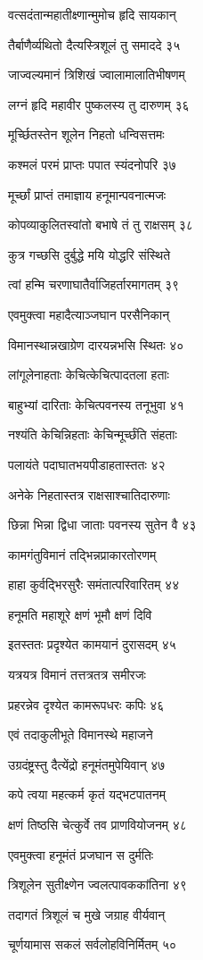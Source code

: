 वत्सदंतान्महातीक्ष्णान्मुमोच हृदि सायकान्

तैर्बाणैर्व्यथितो दैत्यस्त्रिशूलं तु समाददे ३५

जाज्वल्यमानं त्रिशिखं ज्वालामालातिभीषणम्

लग्नं हृदि महावीर पुष्कलस्य तु दारुणम् ३६

मूर्च्छितस्तेन शूलेन निहतो धन्विसत्तमः

कश्मलं परमं प्राप्तः पपात स्यंदनोपरि ३७

मूर्च्छां प्राप्तं तमाज्ञाय हनूमान्पवनात्मजः

कोपव्याकुलितस्वांतो बभाषे तं तु राक्षसम् ३८

कुत्र गच्छसि दुर्बुद्धे मयि योद्धरि संस्थिते

त्वां हन्मि चरणाघातैर्वाजिहर्तारमागतम् ३९

एवमुक्त्वा महादैत्याञ्जघान परसैनिकान्

विमानस्थान्नखाग्रेण दारयन्नभसि स्थितः ४०

लांगूलेनाहताः केचित्केचित्पादतला हताः

बाहुभ्यां दारिताः केचित्पवनस्य तनूभुवा ४१

नश्यंति केचिन्निहताः केचिन्मूर्च्छंति संहताः

पलायंते पदाघातभयपीडाहतास्ततः ४२

अनेके निहतास्तत्र राक्षसाश्चातिदारुणाः

छिन्ना भिन्ना द्विधा जाताः पवनस्य सुतेन वै ४३

कामगंतुविमानं तद्भिन्नप्राकारतोरणम्

हाहा कुर्वद्भिरसुरैः समंतात्परिवारितम् ४४

हनूमति महाशूरे क्षणं भूमौ क्षणं दिवि

इतस्ततः प्रदृश्येत कामयानं दुरासदम् ४५

यत्रयत्र विमानं तत्तत्रतत्र समीरजः

प्रहरन्नेव दृश्येत कामरूपधरः कपिः ४६

एवं तदाकुलीभूते विमानस्थे महाजने

उग्रदंष्ट्रस्तु दैत्येंद्रो हनूमंतमुपेयिवान् ४७

कपे त्वया महत्कर्म कृतं यद्भटपातनम्

क्षणं तिष्ठसि चेत्कुर्वे तव प्राणवियोजनम् ४८

एवमुक्त्वा हनूमंतं प्रजघान स दुर्मतिः

त्रिशूलेन सुतीक्ष्णेन ज्वलत्पावककांतिना ४९

तदागतं त्रिशूलं च मुखे जग्राह वीर्यवान्

चूर्णयामास सकलं सर्वलोहविनिर्मितम् ५०

